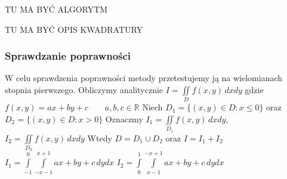 \documentclass[9pt]{beamer}
\newcommand{\n}{\newline}
\begin{document}
\begin{frame}
    TU MA BYĆ ALGORYTM
\end{frame}


\begin{frame}
    TU MA BYĆ OPIS KWADRATURY
\end{frame}


\begin{frame}
\frametitle{Sprawdzanie poprawności}

    \begin{spacing}{2}
        W celu sprawdzenia poprawności metody przetestujemy ją na wielomianach stopnia pierwszego.
        Obliczymy analitycznie $ I = \iint\limits_D f(x,y) \, dx dy $ gdzie
        $ f(x,y) = ax + by + c \qquad a,b,c \in \mathbb{R}$ \n
        Niech $ D_1 = \{(x,y) \in D : x \leq 0\} $ oraz $ D_2 = \{(x,y) \in D : x > 0\} $ \n
        Oznaczmy $ I_1 = \iint\limits_{D_1} f(x,y) \, dx dy $, $ I_2 = \iint\limits_{D_2} f(x,y) \, dx dy $ \n
        Wtedy $ D = D_1 \cup D_2 $ oraz $ I = I_1 + I_2 $ \n
        $ I_1 = \int\limits_{-1}^{0}\int\limits_{-x-1}^{x+1} ax+by+c \, dy dx $ \qquad\n
        $ I_2 = \int\limits_{0}^{1}\int\limits_{x-1}^{-x+1} ax+by+c \, dy dx $ \n
    \end{spacing}

\end{frame}
\end{document}
